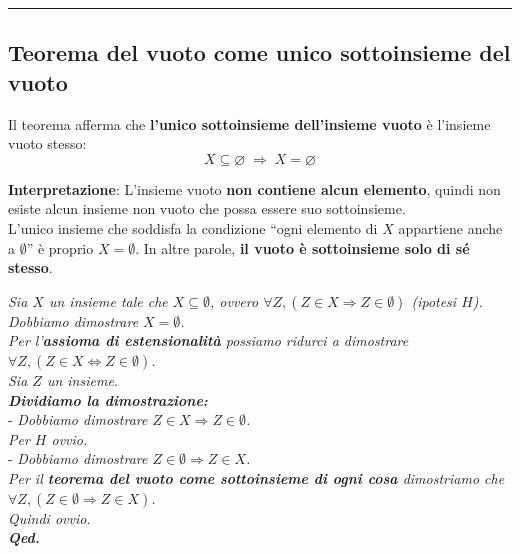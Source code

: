 \documentclass[
  a4paper,
]{article}
\begin{document}
\par\noindent\rule{\linewidth}{0.4pt}\par\vspace{6pt}

\hypertarget{teorema-del-vuoto-come-unico-sottoinsieme-del-vuoto}{%
\subsection{Teorema del vuoto come unico sottoinsieme del
vuoto}\label{teorema-del-vuoto-come-unico-sottoinsieme-del-vuoto}}

Il teorema afferma che \textbf{l'unico sottoinsieme dell'insieme vuoto}
è l'insieme vuoto stesso: \[
X \subseteq \varnothing \;\Rightarrow\; X = \varnothing
\]

\textbf{Interpretazione}: L'insieme vuoto \textbf{non contiene alcun
elemento}, quindi non esiste alcun insieme non vuoto che possa essere
suo sottoinsieme.\\
L'unico insieme che soddisfa la condizione ``ogni elemento di \(X\)
appartiene anche a \(\emptyset\)'' è proprio \(X=\emptyset\). In altre
parole, \textbf{il vuoto è sottoinsieme solo di sé stesso}.

\begin{examplebox}[Dimostrazione]

\emph{Sia \(X\) un insieme tale che \(X \subseteq \emptyset\), ovvero
\(\forall Z , (Z \in X \Rightarrow Z \in \emptyset)\) (ipotesi
\(H\)).}\\
\emph{Dobbiamo dimostrare \(X = \emptyset\).}\\
\emph{Per l'\textbf{assioma di estensionalità} possiamo ridurci a
dimostrare \(\forall Z , (Z \in X \Leftrightarrow Z \in \emptyset)\).}\\
\emph{Sia \(Z\) un insieme.}\\
\textbf{\emph{Dividiamo la dimostrazione:}}\\
- \emph{Dobbiamo dimostrare \(Z \in X \Rightarrow Z \in \emptyset\).}\\
\emph{Per \(H\) ovvio.}\\
- \emph{Dobbiamo dimostrare \(Z \in \emptyset \Rightarrow Z \in X\).}\\
\emph{Per il \textbf{teorema del vuoto come sottoinsieme di ogni cosa}
dimostriamo che
\(\forall Z , (Z \in \emptyset \Rightarrow Z \in X)\).}\\
\emph{Quindi ovvio.}\\
\textbf{\emph{Qed.}}

\end{examplebox}
\end{document}

